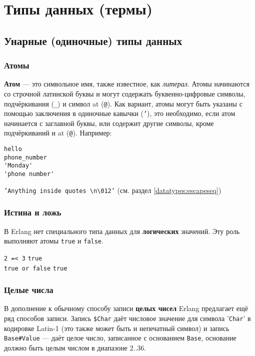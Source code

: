 \chapter{Типы данных (термы)}
\label{datatypes}


\section{Унарные (одиночные) типы данных}


\subsection{Атомы}
\label{datatypes:atom}
\textbf{Атом} --- это символьное имя, также известное, как \textit{литерал}.
Атомы начинаются со строчной латинской буквы и могут содержать буквенно-цифровые
символы, подчёркивания (\texttt{\_}) и символ at (\texttt{@}).
Как вариант, атомы могут быть указаны с помощью заключения в одиночные кавычки
(\texttt{'}), это необходимо, если атом начинается с заглавной буквы, или содержит
другие символы, кроме подчёркиваний и at (\texttt{@}). Например:

\begin{verbatim}
hello
phone_number
'Monday'
'phone number'
\end{verbatim}

\texttt{'Anything inside quotes \textbackslash n\textbackslash 012'}
\hfill(см. раздел \ref{datatypes:escapeseq})


\subsection{Истина и ложь}
\label{datatypes:boolean}
В Erlang нет специального типа данных для \textbf{логических} значений. Эту роль
выполняют атомы \texttt{true} и \texttt{false}.

\texttt{2 =< 3} \resultingin \texttt{true} \\
\texttt{true or false} \resultingin \texttt{true}


\subsection{Целые числа}
\label{datatypes:integer}

В дополнение к обычному способу записи \textbf{целых чисел} Erlang предлагает
ещё ряд способов записи. Запись \texttt{\$Char} даёт числовое значение для 
символа '\texttt{Char}' в кодировке Latin-1 (это также может быть и непечатный
символ) и запись \texttt{Base\#Value} --- даёт целое число, записанное с 
основанием \texttt{Base}, основание должно быть целым числом в диапазоне $2..36$.

